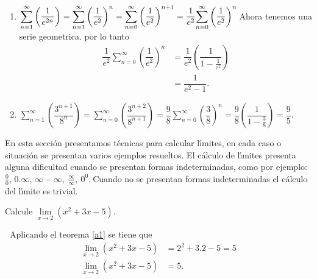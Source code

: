 \begin{sol}
\begin{enumerate}
\item $%
{\displaystyle\sum\limits_{n=1}^{\infty}}
\left(  \dfrac{1}{e^{2n}}\right)  =%
{\displaystyle\sum\limits_{n=1}^{\infty}}
\left(  \dfrac{1}{e^{2}}\right)  ^{n}=%
{\displaystyle\sum\limits_{n=0}^{\infty}}
\left(  \dfrac{1}{e^{2}}\right)  ^{n+1}=\dfrac{1}{e^{2}}%
{\displaystyle\sum\limits_{n=0}^{\infty}}
\left(  \dfrac{1}{e^{2}}\right)  ^{n}\newline$Ahora tenemos una serie
geometrica. por lo tanto%
\begin{align*}
\dfrac{1}{e^{2}}%
{\displaystyle\sum\limits_{n=0}^{\infty}}
\left(  \dfrac{1}{e^{2}}\right)  ^{n}  &  =\dfrac{1}{e^{2}}\left(  \dfrac
{1}{1-\frac{1}{e^{2}}}\right) \\
&  =\dfrac{1}{e^{2}-1}.
\end{align*}


\item $%
{\displaystyle\sum\limits_{n=1}^{\infty}}
\left(  \dfrac{3^{n+1}}{8^{n}}\right)  =%
{\displaystyle\sum\limits_{n=0}^{\infty}}
\left(  \dfrac{3^{n+2}}{8^{n+1}}\right)  =\dfrac{9}{8}%
{\displaystyle\sum\limits_{n=0}^{\infty}}
\left(  \dfrac{3}{8}\right)  ^{n}=\dfrac{9}{8}\left(  \dfrac{1}{1-\frac{3}{8}%
}\right)  =\allowbreak\dfrac{9}{5}.$
\end{enumerate}
\end{sol}

En esta secci\'{o}n presentamos t\'{e}cnicas para calcular l\'{\i}mites, en
cada caso o situaci\'{o}n se presentan varios ejemplos resueltos. El
c\'{a}lculo de l\'{\i}mites presenta alguna dificultad cuando se presentan
formas indeterminadas, como por ejemplo: $\frac{0}{0}$, $0.\infty$,
$\infty-\infty,\ \frac{\infty}{\infty},\ 0^{0}.\ $Cuando no se presentan
formas indeterminadas el c\'{a}lculo del l\'{\i}mite es trivial.

\begin{example}
Calcule $\lim\limits_{x\rightarrow2}(x^{2}+3x-5).$
\end{example}

\begin{sol}
\textbf{\ }Aplicando el teorema \ref{a1} se tiene que
\begin{align*}
\lim\limits_{x\rightarrow2}(x^{2}+3x-5)  &  =2^{2}+3.2-5=5\\
\lim\limits_{x\rightarrow2}(x^{2}+3x-5)  &  =5.
\end{align*}

\end{sol}

